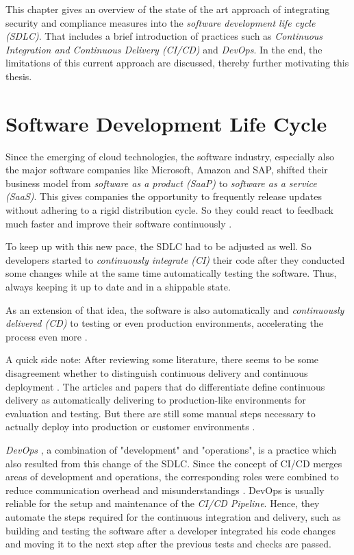 
This chapter gives an overview of the state of the art approach of integrating security and compliance measures into the \textit{software development life cycle (SDLC)}. That includes a brief introduction of practices such as \textit{Continuous Integration and Continuous Delivery (CI/CD)} and \textit{DevOps}. In the end, the limitations of this current approach are discussed, thereby further motivating this thesis. 

\section{Software Development Life Cycle}
Since the emerging of cloud technologies, the software industry, especially also the major software companies like Microsoft, Amazon and SAP, shifted their business model from \textit{software as a product (SaaP)} to \textit{software as a service (SaaS)}. This gives companies the opportunity to frequently release updates without adhering to a rigid distribution cycle. So they could react to feedback much faster and improve their software continuously \cite{DevSecOps, ContinuousSecurity}.\par
To keep up with this new pace, the SDLC had to be adjusted as well. So developers started to \emph{continuously integrate (CI)} their code after they conducted some changes while at the same time automatically testing the software. Thus, always keeping it up to date and in a shippable state.\par
As an extension of that idea, the software is also automatically and \emph{continuously delivered (CD)} to testing or even production environments, accelerating the process even more \cite{CICD}.\par 
A quick side note: After reviewing some literature, there seems to be some disagreement whether to distinguish continuous delivery and continuous deployment \cite{CICD, DevSecOps}. The articles and papers that do differentiate define continuous delivery as automatically delivering to production-like environments for evaluation and testing. But there are still some manual steps necessary to actually deploy into production or customer environments \cite{CICD, CICDDebate1, SecureCloudApplications}.\par
\emph{DevOps} %
, a combination of "development" and "operations", is a practice which also resulted from this change of the SDLC. Since the concept of CI/CD merges areas of development and operations, the corresponding roles were combined to reduce communication overhead and misunderstandings \cite{SecureCloudApplications}. DevOps is usually reliable for the setup and maintenance of the \emph{CI/CD Pipeline}. Hence, they automate the steps required for the continuous integration and delivery, such as building and testing the software after a developer integrated his code changes and moving it to the next step after the previous tests and checks are passed. 
